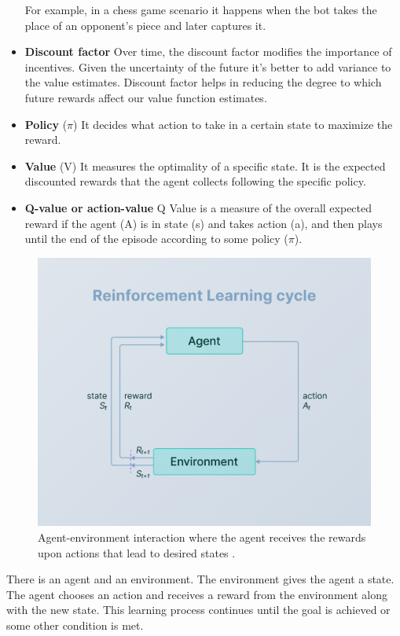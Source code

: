 \documentclass{article}
\begin{document}
\begin{itemize}
For example, in a chess game scenario it happens when the bot takes the place of an opponent's piece and later captures it.
\item \textbf{Discount factor} Over time, the discount factor modifies the importance of incentives. Given the uncertainty of the future it’s better to add variance to the value estimates. Discount factor helps in reducing the degree to which future rewards affect our value function estimates.
\item \textbf{Policy} ($\pi$) It decides what action to take in a certain state to maximize the reward.
\item \textbf{Value} (V) It measures the optimality of a specific state. It is the expected discounted rewards that the agent collects following the specific policy.
\item \textbf{Q-value or action-value} Q Value is a measure of the overall expected reward if the agent (A) is in state (s) and takes action (a), and then plays until the end of the episode according to some policy ($\pi$).
\end{itemize}

\begin{figure}[ht]
\centering
\includegraphics[width=1\textwidth]{image3.png}
\caption{Agent-environment interaction where the agent receives the rewards upon actions that lead to desired states \cite{sutton2018reinforcement}.}
\label{fig: Agent-environment interaction in RL.}
\end{figure}

There is an agent and an environment. The environment gives the agent a state. The agent chooses an action and receives a reward from the environment along with the new state. This learning process continues until the goal is achieved or some other condition is met.
\end{document}
